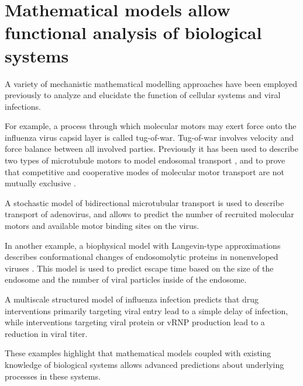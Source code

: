 \section{Mathematical models allow functional analysis of biological systems}

A variety of mechanistic mathematical modelling approaches have been employed previously to analyze and elucidate the function of cellular systems and viral infections.

For example, a process through which molecular motors may exert force onto the influenza virus capsid layer is called tug-of-war. Tug-of-war involves velocity and force balance between all involved parties. Previously it has been used to describe two types of microtubule motors to model endosomal transport \cite{muller2008tug}, and to prove that competitive and cooperative modes of molecular motor transport are not mutually exclusive \cite{muller2008tug}.

A stochastic model of bidirectional microtubular transport \cite{gazzola2009stochastic} is used to describe transport of adenovirus, and allows to predict the number of recruited molecular motors and available motor binding sites on the virus.

In another example, a biophysical model with  Langevin-type approximations  describes conformational changes of endosomolytic proteins in nonenveloped viruses \cite{lagache2012modeling}. This model is used to predict escape time based on the size of the endosome and the number of viral particles inside of the endosome.

A multiscale structured model of influenza infection \cite{heldt2013multiscale} predicts that drug interventions primarily targeting viral entry lead to a simple delay of infection, while interventions targeting viral protein or vRNP  production lead to a reduction in viral titer.

These examples highlight that mathematical models coupled with existing knowledge of biological systems allows advanced predictions about underlying processes in these systems.